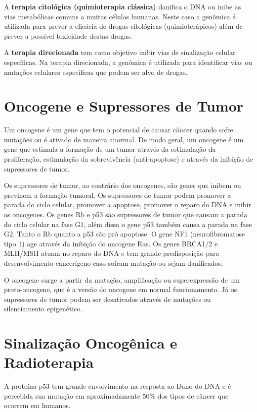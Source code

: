 \documentclass[11pt,a4paper]{article}
\begin{document}
    A \textbf{\textcolor{CarnationPink}{terapia citológica (quimioterapia clássica)}} danifica o DNA ou inibe as vias metabólicas comuns a muitas células humanas. Neste caso a genômica é utilizada para prever a eficácia de drogas citológicas (quimioterápicos) além de prever a possível toxicidade destas drogas.
    
    A \textbf{\textcolor{CarnationPink}{terapia direcionada}} tem como objetivo inibir vias de sinalização celular específicas. Na terapia direcionada, a genômica é utilizada para identificar vias ou mutações celulares específicas que podem ser alvo de drogas. 

\section{Oncogene e Supressores de Tumor}

    Um oncogene é um gene que tem o potencial de causar câncer quando sofre mutações ou é ativado de maneira anormal. De modo geral, um oncogene é um gene que estimula a formação de um tumor através da estimulação da proliferação, estimulação da sobrevivência (anti-apoptose) e através da inibição de supressores de tumor. 

    Os supressores de tumor, ao contrário dos oncogenes, são genes que inibem ou previnem a formação tumoral. Os supressores de tumor podem promover a parada do ciclo celular, promover a apoptose, promover o reparo do DNA e inibir os oncogenes. Os genes Rb e p53 são supressores de tumor que causam a parada do ciclo celular na fase G1, além disso o gene p53 também causa a parada na fase G2. Tanto o Rb quanto a p53 são pró apoptose. O gene NF1 (neurofibromatose tipo 1) age através da inibição do oncogene Ras. Os genes BRCA1/2 e MLH/MSH atuam no reparo do DNA e tem grande predisposição para desenvolvimento cancerígeno caso sofram mutação ou sejam danificados.

    O oncogene surge a partir da mutação, amplificação ou superexpressão de um proto-oncogene, que é a versão do oncogene em normal funcionamento. Já os supressores de tumor podem ser desativados através de mutações ou silenciamento epigenético.

\section{Sinalização Oncogênica e Radioterapia}

    A proteína p53 tem grande envolvimento na resposta ao Dano do DNA e é percebida sua mutação em aproximadamente 50\% dos tipos de câncer que ocorrem em humanos.
\end{document}
